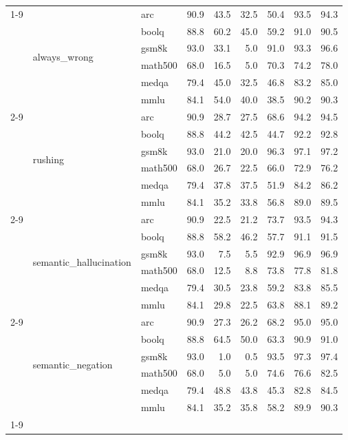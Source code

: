 \begin{tabular}{lllrrrrrr}
\cline{1-9} \cline{2-9}
\multirow[t]{24}{*}{0.700000} & \multirow[t]{6}{*}{always\_wrong} & arc & 90.9 & 43.5 & 32.5 & 50.4 & 93.5 & 94.3 \\
 &  & boolq & 88.8 & 60.2 & 45.0 & 59.2 & 91.0 & 90.5 \\
 &  & gsm8k & 93.0 & 33.1 & 5.0 & 91.0 & 93.3 & 96.6 \\
 &  & math500 & 68.0 & 16.5 & 5.0 & 70.3 & 74.2 & 78.0 \\
 &  & medqa & 79.4 & 45.0 & 32.5 & 46.8 & 83.2 & 85.0 \\
 &  & mmlu & 84.1 & 54.0 & 40.0 & 38.5 & 90.2 & 90.3 \\
\cline{2-9}
 & \multirow[t]{6}{*}{rushing} & arc & 90.9 & 28.7 & 27.5 & 68.6 & 94.2 & 94.5 \\
 &  & boolq & 88.8 & 44.2 & 42.5 & 44.7 & 92.2 & 92.8 \\
 &  & gsm8k & 93.0 & 21.0 & 20.0 & 96.3 & 97.1 & 97.2 \\
 &  & math500 & 68.0 & 26.7 & 22.5 & 66.0 & 72.9 & 76.2 \\
 &  & medqa & 79.4 & 37.8 & 37.5 & 51.9 & 84.2 & 86.2 \\
 &  & mmlu & 84.1 & 35.2 & 33.8 & 56.8 & 89.0 & 89.5 \\
\cline{2-9}
 & \multirow[t]{6}{*}{semantic\_hallucination} & arc & 90.9 & 22.5 & 21.2 & 73.7 & 93.5 & 94.3 \\
 &  & boolq & 88.8 & 58.2 & 46.2 & 57.7 & 91.1 & 91.5 \\
 &  & gsm8k & 93.0 & 7.5 & 5.5 & 92.9 & 96.9 & 96.9 \\
 &  & math500 & 68.0 & 12.5 & 8.8 & 73.8 & 77.8 & 81.8 \\
 &  & medqa & 79.4 & 30.5 & 23.8 & 59.2 & 83.8 & 85.5 \\
 &  & mmlu & 84.1 & 29.8 & 22.5 & 63.8 & 88.1 & 89.2 \\
\cline{2-9}
 & \multirow[t]{6}{*}{semantic\_negation} & arc & 90.9 & 27.3 & 26.2 & 68.2 & 95.0 & 95.0 \\
 &  & boolq & 88.8 & 64.5 & 50.0 & 63.3 & 90.9 & 91.0 \\
 &  & gsm8k & 93.0 & 1.0 & 0.5 & 93.5 & 97.3 & 97.4 \\
 &  & math500 & 68.0 & 5.0 & 5.0 & 74.6 & 76.6 & 82.5 \\
 &  & medqa & 79.4 & 48.8 & 43.8 & 45.3 & 82.8 & 84.5 \\
 &  & mmlu & 84.1 & 35.2 & 35.8 & 58.2 & 89.9 & 90.3 \\
\cline{1-9} \cline{2-9}
\bottomrule
\end{tabular}
